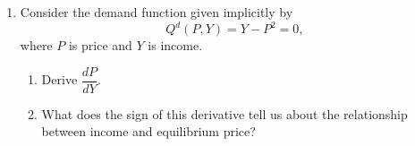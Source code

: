 \documentclass[12pt]{article}
\begin{document}
\begin{enumerate}[label=\textbf{Q\arabic*.}, resume]


    \item Consider the demand function given implicitly by
    \[
    Q^d(P,Y) = Y - P^2 = 0,
    \]
    where $P$ is price and $Y$ is income.
    \begin{enumerate}[label=(\alph*)]
        \item Derive $\dfrac{dP}{dY}$.  
        \item What does the sign of this derivative tell us about the relationship between income and equilibrium price?  
    \end{enumerate}




\end{enumerate}
\end{document}
